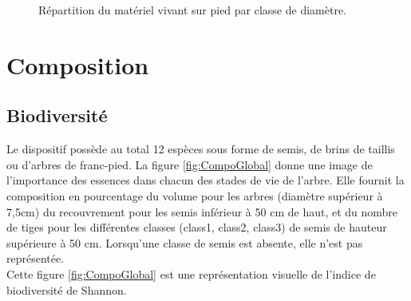 \documentclass[a4paper]{book}\usepackage[]{graphicx}\usepackage[]{color}
\newenvironment{knitrout}{}{} %
\begin{document}
\begin{knitrout}\footnotesize
{}\color{fgcolor}\begin{figure}[h]
\caption[Répartition du matériel vivant sur pied par classe de diamètre]{Répartition du matériel vivant sur pied par classe de diamètre.\label{fig:Classe}}
\end{figure}


\end{knitrout}

\section{Composition}

\subsection{Biodiversité}


Le dispositif possède au total 12 espèces sous forme de semis, de brins de taillis ou d'arbres de franc-pied. La figure \ref{fig:CompoGlobal} donne une image de l'importance des essences dans chacun des stades de vie de l'arbre. Elle fournit la composition en pourcentage du volume pour les arbres (diamètre supérieur à 7,5cm) du recouvrement pour les semis inférieur à 50 cm de haut, et du nombre de tiges pour les différentes classes (class1, class2, class3) de semis de hauteur supérieure à 50 cm. Lorsqu'une classe de semis est absente, elle n'est pas représentée. \\
Cette figure \ref{fig:CompoGlobal} est une représentation visuelle de l'indice de biodiversité de Shannon.
\end{document}
